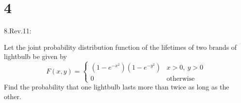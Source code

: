 \documentclass{article}
\begin{document}
\newpage

\section*{4}
\begin{ques}\label{q4}
    8.Rev.11:

    Let the joint probability distribution function of the lifetimes of two brands of lightbulb be given by 
    $$F(x,y)=\begin{cases}
        (1-e^{-x^2})(1-e^{-y^2}) & x>0,\ y>0\\
        0 & \text{otherwise}
    \end{cases}$$
    Find the probability that one lightbulb lasts more than twice as long as the other.
\end{ques}
\end{document}
